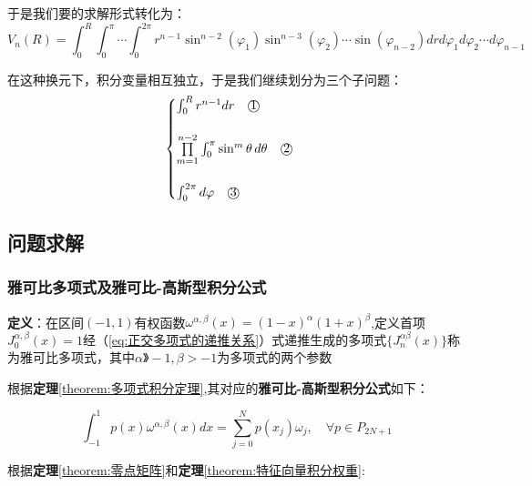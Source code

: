 \documentclass[12pt]{ctexart}
\numberwithin{equation}{section} %
\begin{document}
于是我们要的求解形式转化为：
\begin{equation}
    V_{n}\left(R\right)=\int_{0}^{R}\int_{0}^{\pi}\cdots\int_{0}^{2\pi}r^{n-1}\sin^{n-2}(\varphi_1)\sin^{n-3}(\varphi_2)\cdots\sin(\varphi_{n-2})drd\varphi_1d\varphi_2\cdots d\varphi_{n-1}
\end{equation}

在这种换元下，积分变量相互独立，于是我们继续划分为三个子问题：
\begin{equation}
    \begin{aligned}
        \begin{cases}
        \int_0^R r^{n-1} dr \quad \text{\textcircled{1}}\\\\
        \prod\limits_{m=1}^{n-2} \int^\pi_0 \sin^m \theta \, d\theta \quad \text{\textcircled{2}} \\\\
        \int^{2\pi}_0 d\varphi \quad \text{\textcircled{3}}
    \end{cases}
 \end{aligned}
\end{equation}

\subsection{问题求解}
\subsubsection{雅可比多项式及雅可比-高斯型积分公式}
\textbf{定义}：在区间$(-1,1)$有权函数$\omega^{\alpha,\beta}(x) = (1-x)^\alpha(1+x)^\beta $,定义首项$J^{\alpha,\beta}_0(x)=1$经（\ref{eq:正交多项式的递推关系}）式递推生成的多项式$\{J^{\alpha\beta}_n(x)\}$称为雅可比多项式，其中$\alpha》-1,\beta>-1$为多项式的两个参数

根据\textbf{定理}\ref{theorem:多项式积分定理},其对应的\textbf{雅可比-高斯型积分公式}如下：


\begin{equation}
    \int_{-1}^1p(x) \omega^{\alpha,\beta}(x)dx=\sum_{j=0}^Np(x_j)\omega_j,\quad\forall p\in P_{2N+1}
\label{eq:雅可比-高斯型积分公式}
\end{equation}


根据\textbf{定理}\ref{theorem:零点矩阵}和\textbf{定理}\ref{theorem:特征向量积分权重}:
\end{document}
